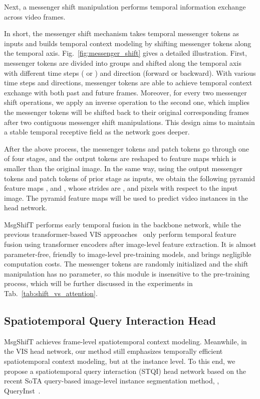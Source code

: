 \documentclass[10pt,twocolumn,letterpaper]{article}
\begin{document}
Next, a messenger shift manipulation performs temporal information exchange across video frames.

In short, the messenger shift mechanism takes temporal messenger tokens  as inputs and builds temporal context modeling by shifting messenger tokens along the temporal axis.
Fig.~\ref{fig:messenger_shift} gives a detailed illustration. First, messenger tokens are divided into  groups and shifted along the temporal axis with different time steps ( or ) and direction (forward or backward).
With various time steps and directions, messenger tokens are able to achieve temporal context exchange with both past and future frames.
Moreover, for every two messenger shift operations, we apply an inverse operation to the second one, which implies the messenger tokens will be shifted back to their original corresponding frames after two contiguous messenger shift manipulations.
This design aims to maintain a stable temporal receptive field as the network goes deeper.

After the above process, the messenger tokens and patch tokens go through one of four stages, and the output tokens are reshaped to feature maps  which is  smaller than the original image. In the same way, using the output messenger tokens and patch tokens of prior stage as inputs, we obtain the following pyramid feature maps ,  and , whose strides are ,  and  pixels with respect to the input image. The pyramid feature maps  will be used to predict video instances in the head network.

MsgShifT performs early temporal fusion in the backbone network, while the previous transformer-based VIS approaches~\cite{vistr, querytrack, tcis, ifc} only perform temporal feature fusion using transformer encoders after image-level feature extraction. It is almost parameter-free, friendly to image-level pre-training models, and brings negligible computation costs. The messenger tokens are randomly initialized and the shift manipulation has no parameter, so this module is insensitive to the pre-training process, which will be further discussed in the experiments in Tab.~\ref{tab:shift_vs_attention}.

\subsection{Spatiotemporal Query Interaction Head}

MsgShifT achieves frame-level spatiotemporal context modeling. Meanwhile, in the VIS head network, our method still emphasizes temporally efficient spatiotemporal context modeling, but at the instance level. To this end, we propose a spatiotemporal query interaction (STQI) head network based on the recent SoTA query-based image-level instance segmentation method, \ie, QueryInst~\cite{queryinst}.
\end{document}
